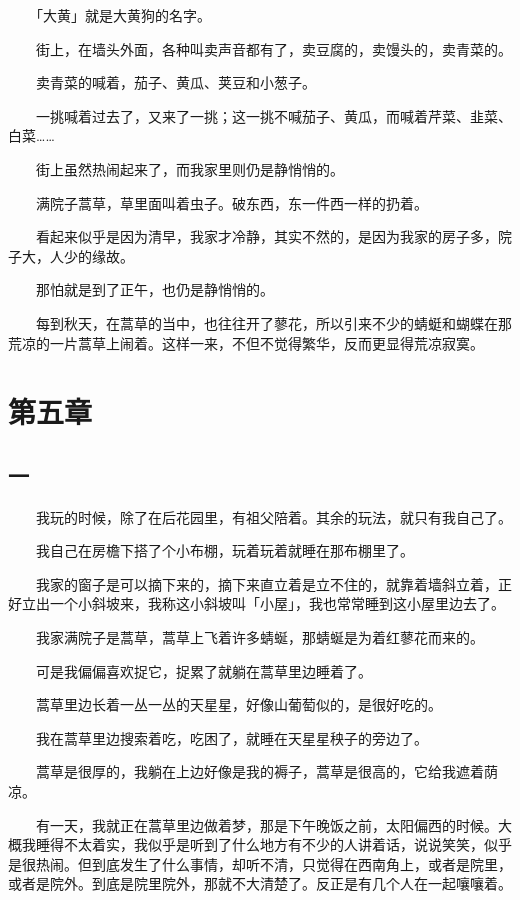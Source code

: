 \documentclass[UTF8]{ctexart}
\begin{document}
　　「大黄」就是大黄狗的名字。

　　街上，在墙头外面，各种叫卖声音都有了，卖豆腐的，卖馒头的，卖青菜的。

　　卖青菜的喊着，茄子、黄瓜、荚豆和小葱子。

　　一挑喊着过去了，又来了一挑；这一挑不喊茄子、黄瓜，而喊着芹菜、韭菜、白菜……

　　街上虽然热闹起来了，而我家里则仍是静悄悄的。

　　满院子蒿草，草里面叫着虫子。破东西，东一件西一样的扔着。

　　看起来似乎是因为清早，我家才冷静，其实不然的，是因为我家的房子多，院子大，人少的缘故。

　　那怕就是到了正午，也仍是静悄悄的。

　　每到秋天，在蒿草的当中，也往往开了蓼花，所以引来不少的蜻蜓和蝴蝶在那荒凉的一片蒿草上闹着。这样一来，不但不觉得繁华，反而更显得荒凉寂寞。

\section{第五章}

\subsection{一}

　　我玩的时候，除了在后花园里，有祖父陪着。其余的玩法，就只有我自己了。

　　我自己在房檐下搭了个小布棚，玩着玩着就睡在那布棚里了。

　　我家的窗子是可以摘下来的，摘下来直立着是立不住的，就靠着墙斜立着，正好立出一个小斜坡来，我称这小斜坡叫「小屋」，我也常常睡到这小屋里边去了。

　　我家满院子是蒿草，蒿草上飞着许多蜻蜒，那蜻蜒是为着红蓼花而来的。

　　可是我偏偏喜欢捉它，捉累了就躺在蒿草里边睡着了。

　　蒿草里边长着一丛一丛的天星星，好像山葡萄似的，是很好吃的。

　　我在蒿草里边搜索着吃，吃困了，就睡在天星星秧子的旁边了。

　　蒿草是很厚的，我躺在上边好像是我的褥子，蒿草是很高的，它给我遮着荫凉。

　　有一天，我就正在蒿草里边做着梦，那是下午晚饭之前，太阳偏西的时候。大概我睡得不太着实，我似乎是听到了什么地方有不少的人讲着话，说说笑笑，似乎是很热闹。但到底发生了什么事情，却听不清，只觉得在西南角上，或者是院里，或者是院外。到底是院里院外，那就不大清楚了。反正是有几个人在一起嚷嚷着。
\end{document}
